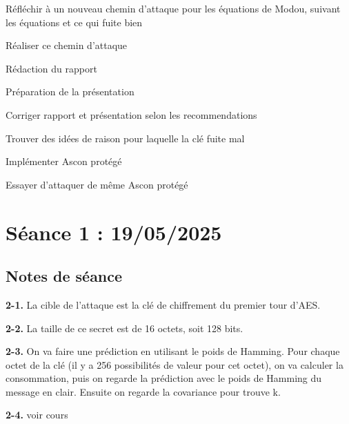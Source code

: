 \documentclass[12pt]{article}
\newcommand{\cmark}{\ding{51}}%
\newcommand{\xmark}{\ding{55}}%
\newcommand{\done}{\rlap{$\square$}{\raisebox{2pt}{\large\hspace{1pt}\cmark}}%
	\hspace{-2.5pt}}
\newcommand{\wontfix}{\rlap{$\square$}{\large\hspace{1pt}\xmark}}
\begin{document}
\begin{todolist}
		\item[\done] Réfléchir à un nouveau chemin d'attaque pour les équations de Modou, suivant les équations et ce qui fuite bien
		\item[\done] Réaliser ce chemin d'attaque
		\item[\done] Rédaction du rapport
		\item[\done] Préparation de la présentation
		\item[\done] Corriger rapport et présentation selon les recommendations
		\item[\done] Trouver des idées de raison pour laquelle la clé fuite mal
		\item Implémenter Ascon protégé
		\item[\wontfix] Essayer d'attaquer de même Ascon protégé
	\end{todolist}
	\section{Séance 1 : 19/05/2025}
	\subsection{Notes de séance}
	
	\textbf{2-1.} La cible de l'attaque est la clé de chiffrement du premier tour d'AES.
	
	\noindent \textbf{2-2.} La taille de ce secret est de 16 octets, soit 128 bits.
	
	\noindent \textbf{2-3.} On va faire une prédiction en utilisant le poids de Hamming. Pour chaque octet de la clé (il y a 256 possibilités de valeur pour cet octet), on va calculer la consommation, puis on regarde la prédiction avec le poids de Hamming du message en clair. Ensuite on regarde la covariance pour trouve k.
	
	\noindent \textbf{2-4.} voir cours
	
\end{document}
